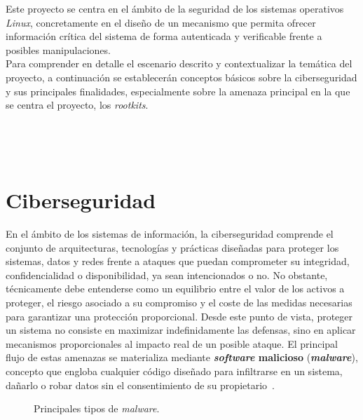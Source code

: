 Este proyecto se centra en el ámbito de la seguridad de los sistemas operativos \textit{Linux}, concretamente en el diseño de un mecanismo que permita ofrecer información crítica del sistema de forma autenticada y verificable frente a posibles manipulaciones.\\

Para comprender en detalle el escenario descrito y contextualizar la temática del proyecto, a continuación se establecerán conceptos básicos sobre la ciberseguridad y sus principales finalidades, especialmente sobre la amenaza principal en la que se centra el proyecto, los \textit{rootkits}.

\

\

\section{Ciberseguridad}
\label{sec:seccion2}

En el ámbito de los sistemas de información, la ciberseguridad comprende el conjunto de arquitecturas, tecnologías y prácticas diseñadas para proteger los sistemas, datos y redes frente a ataques que puedan comprometer su integridad, confidencialidad o disponibilidad, ya sean intencionados o no.
No obstante, técnicamente debe entenderse como un equilibrio entre el valor de los activos a proteger, el riesgo asociado a su compromiso y el coste de las medidas necesarias para garantizar una protección proporcional.
Desde este punto de vista, proteger un sistema no consiste en maximizar indefinidamente las defensas, sino en aplicar mecanismos proporcionales al impacto real de un posible ataque.
El principal flujo de estas amenazas se materializa mediante \textbf{\textit{software} malicioso} (\textbf{\textit{malware}}), concepto que engloba cualquier código diseñado para infiltrarse en un sistema, dañarlo o robar datos sin el consentimiento de su propietario~\cite{malware_nist}.\\

\begin{figure}[h!]
  \centering
  \scalebox{0.85}{}
  \caption{Principales tipos de \textit{malware}.}
  \label{fig:types-malware}
\end{figure}

